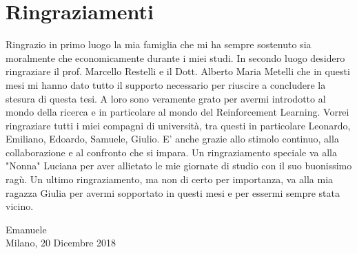 \chapter*{Ringraziamenti}


Ringrazio in primo luogo la mia famiglia che mi ha sempre sostenuto sia moralmente che economicamente durante i miei studi. \newline
In secondo luogo desidero ringraziare il prof. Marcello Restelli e il Dott. Alberto Maria Metelli che in questi mesi mi hanno dato tutto il supporto necessario per riuscire a concludere la stesura di questa tesi. A loro sono veramente grato per avermi introdotto al mondo della ricerca e in particolare al mondo del Reinforcement Learning. \newline
Vorrei ringraziare tutti i miei compagni di università, tra questi in particolare Leonardo, Emiliano, Edoardo, Samuele, Giulio. E' anche grazie allo stimolo continuo, alla collaborazione e al confronto che si impara. \newline
Un ringraziamento speciale va alla "Nonna" Luciana per aver allietato le mie giornate di studio con il suo buonissimo ragù. \newline
Un ultimo ringraziamento, ma non di certo per importanza, va alla mia ragazza Giulia per avermi sopportato in questi mesi e per essermi sempre stata vicino.  \newline
\begin{flushright}
Emanuele \\
Milano, 20 Dicembre 2018
\end{flushright}
